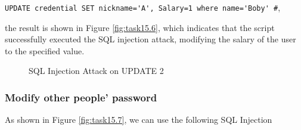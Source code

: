 \documentclass[a4paper,11pt]{article}
\begin{document}
\verb|UPDATE credential SET nickname='A', Salary=1 where name='Boby' #|, 

the result is shown in Figure \ref{fig:task15.6}, which indicates that the script successfully executed the SQL injection attack, modifying the salary of the user to the specified value.


\begin{figure}[h]
    \centering
    \hfill
    \hfill
    \hfill
    \caption{SQL Injection Attack on UPDATE 2}\label{fig:task15-2}
\end{figure}

\subsubsection{Modify other people’ password}
As shown in Figure \ref{fig:task15.7}, we can use the following SQL Injection 
\end{document}
